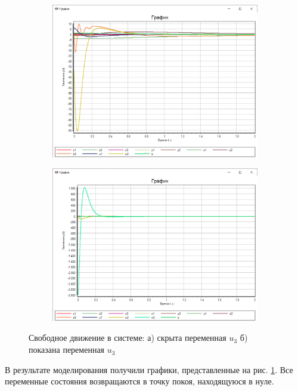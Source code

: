 	\begin{figure}[!h]
		\begin{subfigure}{.5\textwidth}
			\centering\includegraphics[width=.95\textwidth]{png/graph2.1.png}
			\caption{}
		\end{subfigure}
		\begin{subfigure}{.5\textwidth}
			\centering\includegraphics[width=.95\textwidth]{png/graph2.2.png}
			\caption{}
		\end{subfigure}
		\caption{Свободное движение в системе: а) скрыта переменная $u_3$ б) показана переменная $u_3$}
		\label{graph2} 
	\end{figure}
	
	В результате моделирования получили графики, представленные на рис. \ref{graph2}. Все переменные состояния возвращаются в точку покоя, находящуюся в нуле.
	\newpage
